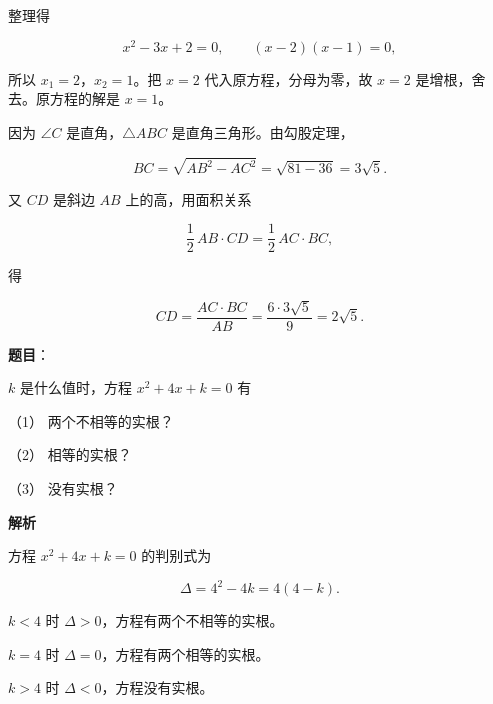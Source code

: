 \begin{answer}
整理得

\nopagebreak[4]
\[
x^2-3x+2=0,
\qquad
(x-2)(x-1)=0,
\]

所以 $x_1=2$，$x_2=1$。把 $x=2$ 代入原方程，分母为零，故 $x=2$ 是增根，舍去。原方程的解是 $x=1$。


因为 $\angle C$ 是直角，$\triangle ABC$ 是直角三角形。由勾股定理，

\nopagebreak[4]
\[
BC=\sqrt{AB^2-AC^2}
=\sqrt{81-36}=3\sqrt5.
\]

又 $CD$ 是斜边 $AB$ 上的高，用面积关系

\nopagebreak[4]
\[
\frac12\,AB\cdot CD=\frac12\,AC\cdot BC,
\]

得

\nopagebreak[4]
\[
CD=\frac{AC\cdot BC}{AB}
=\frac{6\cdot3\sqrt5}{9}
=2\sqrt5.
\]
\nopagebreak[4]
\begin{center}\end{center}
\nopagebreak[4]



\end{answer}
\begin{answer}

\textbf{题目}：

$k$ 是什么值时，方程 $x^2+4x+k=0$ 有

（1） 两个不相等的实根？

（2） 相等的实根？

（3） 没有实根？

\textbf{解析}

方程 $x^2+4x+k=0$ 的判别式为

\nopagebreak[4]
\[
\Delta=4^2-4k=4(4-k).
\]


$k<4$ 时 $\Delta>0$，方程有两个不相等的实根。


$k=4$ 时 $\Delta=0$，方程有两个相等的实根。


$k>4$ 时 $\Delta<0$，方程没有实根。




\end{answer}
